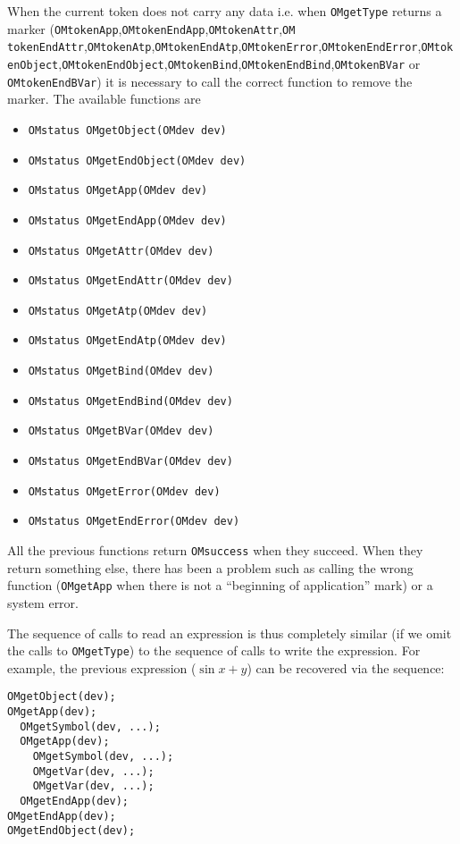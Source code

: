\documentclass{article}
\begin{document}
When the current token does not carry any data i.e. when {\tt OMgetType}
returns a marker ({\tt OMtokenApp},{\tt OMtokenEndApp},{\tt OMtokenAttr},{\tt OM tokenEndAttr},{\tt OMtokenAtp},{\tt OMtokenEndAtp},{\tt OMtokenError},{\tt OMtokenEndError},{\tt OMtokenObject},{\tt OMtokenEndObject},{\tt OMtokenBind},{\tt  OMtokenEndBind},{\tt OMtokenBVar} or {\tt OMtokenEndBVar}) it is necessary to call the correct function to remove the
marker. The available functions are
\begin{itemize} 
\item \verb+OMstatus OMgetObject(OMdev dev)+
\item \verb+OMstatus OMgetEndObject(OMdev dev)+
\item \verb+OMstatus OMgetApp(OMdev dev)+
\item \verb+OMstatus OMgetEndApp(OMdev dev)+
\item \verb+OMstatus OMgetAttr(OMdev dev)+
\item \verb+OMstatus OMgetEndAttr(OMdev dev)+
\item \verb+OMstatus OMgetAtp(OMdev dev)+
\item \verb+OMstatus OMgetEndAtp(OMdev dev)+
\item \verb+OMstatus OMgetBind(OMdev dev)+
\item \verb+OMstatus OMgetEndBind(OMdev dev)+
\item \verb+OMstatus OMgetBVar(OMdev dev)+
\item \verb+OMstatus OMgetEndBVar(OMdev dev)+
\item \verb+OMstatus OMgetError(OMdev dev)+
\item \verb+OMstatus OMgetEndError(OMdev dev)+

\end{itemize} 


All the previous functions return {\tt OMsuccess} when they succeed. When
they return something else, there has been a problem such as calling the
wrong function ({\tt OMgetApp} when there is not a ``beginning of
application'' mark) or a system error. 

The sequence of calls to read an expression is thus completely similar
(if we omit the calls to {\tt OMgetType}) to the sequence of calls to
write the expression. For example, the previous expression ($\sin x + y$)
can be recovered via the sequence:
\begin{verbatim} 
OMgetObject(dev);
OMgetApp(dev);
  OMgetSymbol(dev, ...);
  OMgetApp(dev);
    OMgetSymbol(dev, ...);
    OMgetVar(dev, ...);
    OMgetVar(dev, ...);
  OMgetEndApp(dev);
OMgetEndApp(dev);
OMgetEndObject(dev);
\end{verbatim} 
\end{document}
